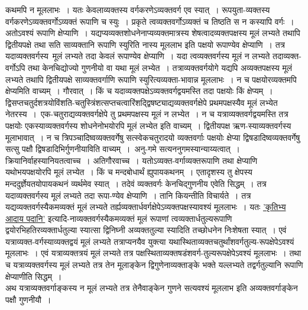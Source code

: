 \documentclass[11pt, openany]{book}
\begin{document}
\begin{sloppypar}
\noindent कथमपि न मूललाभः~। यतः केवलाव्यक्तस्य वर्गकरणेऽव्यक्तवर्ग एव स्यात्~। रूपयुता-व्यक्तस्य वर्गकरणेऽव्यक्तवर्गोऽव्यक्तं रूपाणि च स्युः~। प्रकृते त्वव्यक्तवर्गोऽव्यक्तं च तिष्ठति स न कस्यापि वर्गः~। अतोऽवश्यं रूपाणि क्षेप्याणि~। यद्यप्यव्यक्तशोधनेनाप्यव्यक्तमात्रस्य शेषत्वादव्यक्तपक्षस्य मूलं लभ्यते तथापि द्वितीयपक्षे तथा सति साव्यक्तानि रूपाणि स्युरिति नास्य मूललाभ इति पक्षयो रूपाण्येव क्षेप्याणि~। तत्र यदाव्यक्तवर्गस्य~मूलं लभ्यते तदा केवलं रूपाण्येव क्षेप्याणि~। यदा त्वव्यक्तवर्गस्य मूलं न लभ्यते तदाव्यक्त-वर्गोऽपि तथा केनचिद्योज्यो गुणनीयो वा यथा मूलं लभ्येत~। तत्राव्यक्तवर्गयोगे यद्यपि अव्यक्तपक्षस्य मूलं लभ्यते तथापि द्वितीयपक्षे साव्यक्तवर्गाणि रूपाणि स्युरित्यव्यक्ता-भावान्न मूललाभः~। न च पक्षयोरव्यक्तमपि क्षेप्यमिति वाच्यम्~। गौरवात्~। किं च यदाव्यक्तपक्षेऽव्यक्तवर्गद्वयमस्ति तदा पक्षयोः किं क्षेप्यम्~। द्विसप्तचतुर्दशत्रयोविंशति-चतुस्त्रिंशत्सप्तचत्वारिंशद्द्विषष्ट्याद्यव्यक्तवर्गक्षेपे प्रथमपक्षस्यैव मूलं लभ्येत नेतरस्य~।~एक-चतुराद्यव्यक्तवर्गक्षेपे तु प्रथमपक्षस्य मूलं न लभ्येत~। न च यत्राव्यक्तवर्गद्वयमस्ति तत्र पक्षयोः एकस्याव्यक्तवर्गस्य शोधनेनोभयोरपि मूलं लभ्येत इति वाच्यम्~। द्वितीयपक्ष ऋण-स्याव्यक्तवर्गस्य मूलाभावात्~। न च त्रिपञ्चादिष्वव्यक्तवर्गेषु सत्स्वेकचतुरादयो व्यक्तवर्गाः पक्षयोः क्षेप्या द्विषडादिष्वव्यक्तवर्गेषु सत्सु पक्षौ द्विषडादिभिर्गुणनीयाविति वाच्यम्~।~अनु-गमे सत्यननुगमस्यान्याय्यत्वात्~। क्रियानिर्वाहस्यानियतत्वाच्च~। अतिगौरवाच्च~। यतोऽव्यक्त-वर्गाव्यक्तरूपाणि तथा क्षेप्याणि यथोभयपक्षयोरपि मूलं लभ्येत~। किं च मन्दबोधार्थं ह्युपायकथनम्~। एतादृशस्य तु क्षेपस्य मन्ददुर्ज्ञेयतयोपायकथनं व्यर्थमेव स्यात्~। तदेवं व्यक्तवर्गः केनचिद्गुणनीय एवेति सिद्धम्~। तत्र यदाव्यक्तवर्गस्य मूलं लभ्यते तदा रूपा-ण्येव क्षेप्याणि~। तानि कियन्तीति विचार्यते~। तत्र यद्यव्यक्तवर्गस्यैकमव्यक्तं मूलं लभ्यते तर्ह्यव्यक्तार्धवर्गक्षेपेऽव्यक्तपक्षस्यावश्यं मूललाभः~। यतः \hyperref[3.31]{'कृतिभ्य आदाय पदानि'} इत्यादि-नाव्यक्तवर्गस्यैकमव्यक्तं मूलं रूपाणां त्वव्यक्तार्धतुल्यरूपाणि द्वयोरभिहतिरव्यक्तार्धतुल्या स्यात्सा द्विनिघ्नी अव्यक्ततुल्या स्यादिति तच्छोधनेन निःशेषता स्यात्~। एवं यत्राव्यक्त-वर्गस्याव्यक्तद्वयं मूलं लभ्यते तत्राप्यनयैव युक्त्या यथास्थिताव्यक्तचतुर्थांशवर्गतुल्य-रूपक्षेपेऽवश्यं मूललाभः~। एवं यत्राव्यक्तत्रयं मूलं लभ्यते तत्र पक्षस्थिताव्यक्तषडंशवर्ग-तुल्यरूपक्षेपेऽवश्यं मूललाभः~। तथा च यत्राव्यक्तवर्गस्य मूलं लभ्यते तत्र तेन मूलाङ्केन द्विगुणेनाव्यक्ताङ्के भक्ते यल्लभ्यते तद्वर्गतुल्यानि रूपाणि क्षेप्याणीति सिद्धम्~।\\

अथ यत्राव्यक्तवर्गाङ्कस्य न मूलं लभ्यते तत्र तेनैवाङ्केन गुणने सत्यवश्यं मूललाभ इति अव्यक्तवर्गाङ्केन पक्षौ गुणनीयौ~।
\end{sloppypar}
\end{document}
